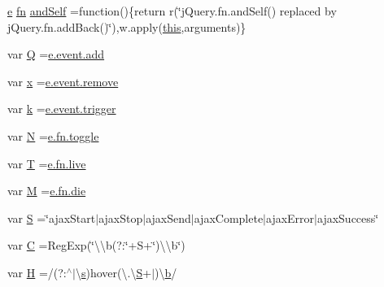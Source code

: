 \begin{DoxyCompactItemize}
\item 
\hyperlink{jqplot_8barRenderer_8min_8js_a2ce90ea5f2a400a3a152319491a737ff}{e} \hyperlink{jquery_8min_8js_af453dd93808e2e2826fd92ab8c394cfc}{fn} \hyperlink{jquery-1_8x_8min_8js_a87feebad0d5e7f093f60e89bd1135092}{and\+Self} =function()\{return r(\char`\"{}j\+Query.\+fn.\+and\+Self() replaced by j\+Query.\+fn.\+add\+Back()\char`\"{}),w.\+apply(\hyperlink{jquery_8parallax-scroll_8min_8js_a05c09a5e9d53fa7adf0a7936038c2fa3}{this},arguments)\}
\item 
var \hyperlink{jquery-1_8x_8min_8js_a044ff3ae9eca11d4603780243cdfc911}{Q} =\hyperlink{jquery_8js_a638fd10c6d2f5e258459b1abfa3b94ea}{e.\+event.\+add}
\item 
var \hyperlink{jquery-1_8x_8min_8js_a81e910173af87b1161e719a504d52407}{x} =\hyperlink{jquery_8js_ac2bfeac9f445211e9176a527d3a292c4}{e.\+event.\+remove}
\item 
var \hyperlink{jquery-1_8x_8min_8js_ab26645c014aa005ecedef329ecf58c99}{k} =\hyperlink{jquery_8js_a3a2670632785d79909fadd16431e30f9}{e.\+event.\+trigger}
\item 
var \hyperlink{jquery-1_8x_8min_8js_ab8a5cba0bbaa18ec7f830663874cb9d0}{N} =\hyperlink{jquery_8js_ac78f284f91282bbaa8bfd9763293cebb}{e.\+fn.\+toggle}
\item 
var \hyperlink{jquery-1_8x_8min_8js_aa798e0c32253f973f3154aa30c996eb2}{T} =\hyperlink{jquery_8js_ab8c156c437a408c01f80567143402f4b}{e.\+fn.\+live}
\item 
var \hyperlink{jquery-1_8x_8min_8js_af33e4fb80081524297d84c89540aeaca}{M} =\hyperlink{jquery_8js_af7e4e16696e8209560e9d5e304ea7628}{e.\+fn.\+die}
\item 
var \hyperlink{jquery-1_8x_8min_8js_a8bab16140cede5f71c657e8dc46c1887}{S} =\char`\"{}ajax\+Start$\vert$ajax\+Stop$\vert$ajax\+Send$\vert$ajax\+Complete$\vert$ajax\+Error$\vert$ajax\+Success\char`\"{}
\item 
var \hyperlink{jquery-1_8x_8min_8js_ae59e0ac8d0c43c81f50236f719763efc}{C} =Reg\+Exp(\char`\"{}\textbackslash{}\textbackslash{}b(?\+:\char`\"{}+S+\char`\"{})\textbackslash{}\textbackslash{}b\char`\"{})
\item 
var \hyperlink{jquery-1_8x_8min_8js_abd057520df7a5dc64fe29b4edd3166a3}{H} =/(?\+:$^\wedge$$\vert$\textbackslash{}\hyperlink{respond_8min_8js_ad9a7d92cb87932d25187fdec3ba1b621}{s})hover(\textbackslash{}.\textbackslash{}\hyperlink{jquery-1_8x_8min_8js_a8bab16140cede5f71c657e8dc46c1887}{S}+$\vert$)\textbackslash{}\hyperlink{jqplot_8barRenderer_8min_8js_a2fc619a5cd76c0e5c2bd9f57a6fcbd3e}{b}/
\item 
$$
\end{DoxyCompactItemize}
